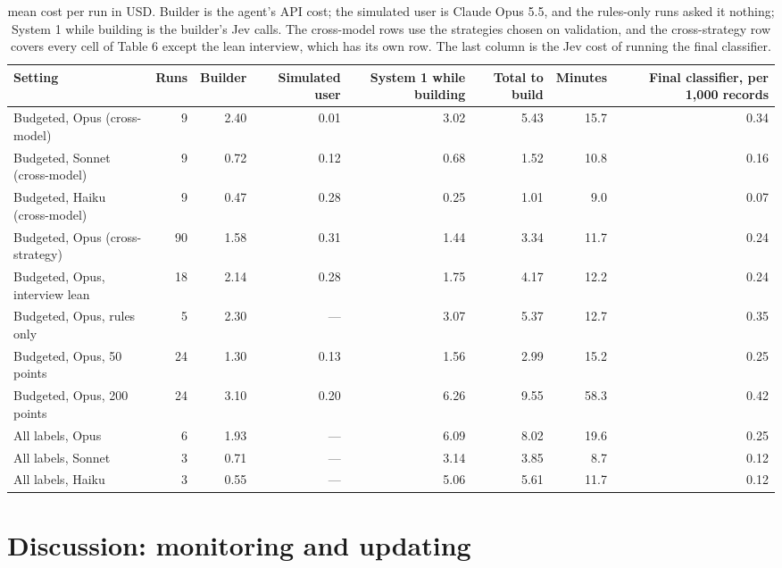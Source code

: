 \documentclass[11pt]{article}
\begin{document}
\begin{table}[t]
\centering\small\setlength{\tabcolsep}{3.5pt}
\begin{tabularx}{\textwidth}{lRRRRRRR}
\toprule
Setting & Runs & Builder & Simulated user & System 1 while building & Total to build & Minutes & Final classifier, per 1,000 records \\
\midrule
Budgeted, Opus (cross-model) & 9 & 2.40 & 0.01 & 3.02 & 5.43 & 15.7 & 0.34 \\
Budgeted, Sonnet (cross-model) & 9 & 0.72 & 0.12 & 0.68 & 1.52 & 10.8 & 0.16 \\
Budgeted, Haiku (cross-model) & 9 & 0.47 & 0.28 & 0.25 & 1.01 & 9.0 & 0.07 \\
Budgeted, Opus (cross-strategy) & 90 & 1.58 & 0.31 & 1.44 & 3.34 & 11.7 & 0.24 \\
Budgeted, Opus, interview lean & 18 & 2.14 & 0.28 & 1.75 & 4.17 & 12.2 & 0.24 \\
Budgeted, Opus, rules only & 5 & 2.30 & --- & 3.07 & 5.37 & 12.7 & 0.35 \\
Budgeted, Opus, 50 points & 24 & 1.30 & 0.13 & 1.56 & 2.99 & 15.2 & 0.25 \\
Budgeted, Opus, 200 points & 24 & 3.10 & 0.20 & 6.26 & 9.55 & 58.3 & 0.42 \\
All labels, Opus & 6 & 1.93 & --- & 6.09 & 8.02 & 19.6 & 0.25 \\
All labels, Sonnet & 3 & 0.71 & --- & 3.14 & 3.85 & 8.7 & 0.12 \\
All labels, Haiku & 3 & 0.55 & --- & 5.06 & 5.61 & 11.7 & 0.12 \\
\bottomrule
\end{tabularx}
\caption{mean cost per run in USD. Builder is the agent's API cost; the simulated user is Claude Opus 5.5, and the rules-only runs asked it nothing; System 1 while building is the builder's Jev calls. The cross-model rows use the strategies chosen on validation, and the cross-strategy row covers every cell of Table 6 except the lean interview, which has its own row. The last column is the Jev cost of running the final classifier.}
\label{tab:10}
\end{table}

\section{Discussion: monitoring and updating}
\end{document}
